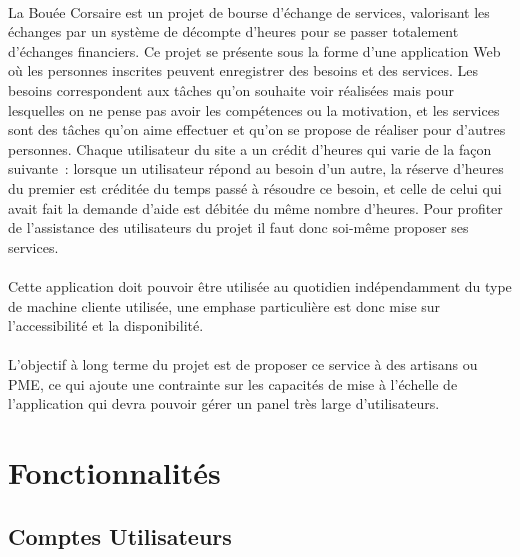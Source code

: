 \documentclass[french,12pt]{article}
\begin{document}
		\paragraph{}
			La Bouée Corsaire est un projet de bourse d’échange de services,
			 valorisant les échanges par un système de décompte d’heures pour se
			 passer totalement d’échanges financiers. Ce projet se présente sous la
			 forme d’une application Web où les personnes inscrites peuvent
			 enregistrer des besoins et des services. Les besoins correspondent aux
			 tâches qu’on souhaite voir réalisées mais pour lesquelles on ne pense pas
			 avoir les compétences ou la motivation, et les services sont des tâches
			 qu’on aime effectuer et qu’on se propose de réaliser pour d’autres
			 personnes. Chaque utilisateur du site a un crédit d’heures qui varie de
			 la façon suivante : lorsque un utilisateur répond au besoin d’un autre,
			 la réserve d’heures du premier est créditée du temps passé à résoudre ce
			 besoin, et celle de celui qui avait fait la demande d’aide est débitée du
			 même nombre d’heures. Pour profiter de l’assistance des utilisateurs du
			 projet il faut donc soi-même proposer ses services.
		\paragraph{}
			Cette application doit pouvoir être utilisée au quotidien indépendamment
			 du type de machine cliente utilisée, une emphase particulière est donc
			 mise sur l’accessibilité et la disponibilité.
		\paragraph{}
			L’objectif à long terme du projet est de proposer ce service à des
			 artisans ou PME, ce qui ajoute une contrainte sur les capacités de mise à
			 l’échelle de l’application qui devra pouvoir gérer un panel très large
			 d’utilisateurs.
			
	\newpage
	\section{Fonctionnalités}
		\localtableofcontents
		
		\newpage
		\subsection{Comptes Utilisateurs}
			
\end{document}
